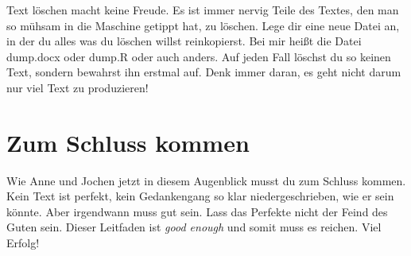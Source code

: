 \documentclass[
  letterpaper,
  DIV=11,
  oneside]{scrreport}
\begin{document}
Text löschen macht keine Freude. Es ist immer nervig Teile des Textes,
den man so mühsam in die Maschine getippt hat, zu löschen. Lege dir eine
neue Datei an, in der du alles was du löschen willst reinkopierst. Bei
mir heißt die Datei dump.docx oder dump.R oder auch anders. Auf jeden
Fall löschst du so keinen Text, sondern bewahrst ihn erstmal auf. Denk
immer daran, es geht nicht darum nur viel Text zu produzieren!

\hypertarget{zum-schluss-kommen}{%
\section{Zum Schluss kommen}\label{zum-schluss-kommen}}

Wie Anne und Jochen
jetzt in diesem Augenblick musst du zum Schluss kommen. Kein Text ist
perfekt, kein Gedankengang so klar niedergeschrieben, wie er sein
könnte. Aber irgendwann muss gut sein. Lass das Perfekte nicht der Feind
des Guten sein. Dieser Leitfaden ist \emph{good enough} und somit muss
es reichen. Viel Erfolg!
\end{document}
